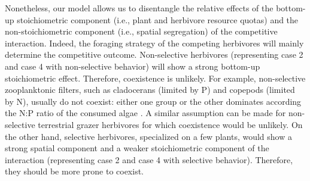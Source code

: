 \documentclass[12pt]{article}
\begin{document}
Nonetheless, our model allows us to disentangle the relative effects of the bottom-up stoichiometric component (i.e., plant and herbivore resource quotas) and the non-stoichiometric component (i.e., spatial segregation) of the competitive interaction. Indeed, the foraging strategy of the competing herbivores will mainly determine the competitive outcome. Non-selective herbivores (representing case 2 and case 4 with non-selective behavior) will show a strong bottom-up stoichiometric effect. Therefore, coexistence is unlikely. For example, non-selective zooplanktonic filters, such as cladocerans (limited by P) and copepods (limited by N), usually do not coexist: either one group or the other dominates according the N:P ratio of the consumed algae \citep{Andersen1991, Hessen1992, Sterner1992, Elser1996, Koski1999}. A similar assumption can be made for non-selective terrestrial grazer herbivores \citep{Albon1992} for which coexistence would be unlikely. On the other hand, selective herbivores, specialized on a few plants, would show a strong spatial component and a weaker stoichiometric component of the interaction (representing case 2 and case 4 with selective behavior). Therefore, they should be more prone to coexist. \par
\end{document}
